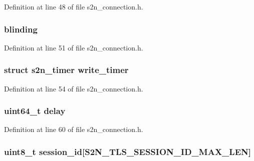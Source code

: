 Definition at line 48 of file s2n\+\_\+connection.\+h.

\subsubsection[{\texorpdfstring{blinding}{blinding}}]{ blinding}\hypertarget{structs2n__connection_a1bfa8f7b48f1d0d742fed4a18b4d3f40}{}\label{structs2n__connection_a1bfa8f7b48f1d0d742fed4a18b4d3f40}


Definition at line 51 of file s2n\+\_\+connection.\+h.

\subsubsection[{\texorpdfstring{write\+\_\+timer}{write_timer}}]{\setlength{\rightskip}{0pt plus 5cm}struct {\bf s2n\+\_\+timer} write\+\_\+timer}\hypertarget{structs2n__connection_a31018fa57bbc729b543d5d33a937748b}{}\label{structs2n__connection_a31018fa57bbc729b543d5d33a937748b}


Definition at line 54 of file s2n\+\_\+connection.\+h.

\subsubsection[{\texorpdfstring{delay}{delay}}]{\setlength{\rightskip}{0pt plus 5cm}uint64\+\_\+t delay}\hypertarget{structs2n__connection_a8c0b95ab06c950bd9afd8444922d98a3}{}\label{structs2n__connection_a8c0b95ab06c950bd9afd8444922d98a3}


Definition at line 60 of file s2n\+\_\+connection.\+h.

\subsubsection[{\texorpdfstring{session\+\_\+id}{session_id}}]{\setlength{\rightskip}{0pt plus 5cm}uint8\+\_\+t session\+\_\+id\mbox{[}{\bf S2\+N\+\_\+\+T\+L\+S\+\_\+\+S\+E\+S\+S\+I\+O\+N\+\_\+\+I\+D\+\_\+\+M\+A\+X\+\_\+\+L\+EN}\mbox{]}}\hypertarget{structs2n__connection_ad009472eb0ee35fef5b49e42599a84a1}{}\label{structs2n__connection_ad009472eb0ee35fef5b49e42599a84a1}


